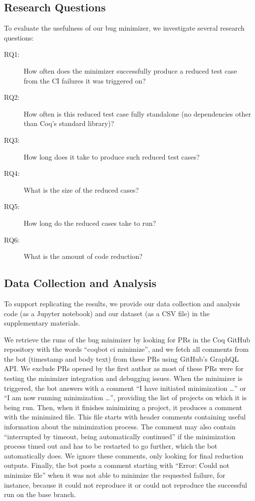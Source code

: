 \documentclass[a4paper,USenglish,cleveref,autoref,thm-restate]{lipics-v2021}
\begin{document}
\subsection{Research Questions}

To evaluate the usefulness of our bug minimizer, we investigate several research questions:

\begin{description}
\item[RQ1:] How often does the minimizer successfully produce a reduced test case from the CI failures it was triggered on?
\item[RQ2:] How often is this reduced test case fully standalone (no dependencies other than Coq's standard library)?
\item[RQ3:] How long does it take to produce such reduced test cases?
\item[RQ4:] What is the size of the reduced cases?
\item[RQ5:] How long do the reduced cases take to run?
\item[RQ6:] What is the amount of code reduction?
\end{description}

\subsection{Data Collection and Analysis}

To support replicating the results, we provide our data collection and analysis code (as a Jupyter notebook) and our dataset (as a CSV file) in the supplementary materials.

We retrieve the runs of the bug minimizer by looking for PRs in the Coq GitHub repository with the words ``coqbot ci minimize'', and we fetch all comments from the bot (timestamp and body text) from these PRs using GitHub's GraphQL API.
We exclude PRs opened by the first author as most of these PRs were for testing the minimizer integration and debugging issues.
When the minimizer is triggered, the bot answers with a comment ``I have initiated minimization \ldots'' or ``I am now running minimization \ldots'', providing the list of projects on which it is being run.
%
Then, when it finishes minimizing a project, it produces a comment with the minimized file.
%
This file starts with header comments containing useful information about the minimization process. %
%
The comment may also contain ``interrupted by timeout, being automatically continued'' if the minimization process timed out and has to be restarted to go further, which the bot automatically does.
%
We ignore these comments, only looking for final reduction outputs.
%
Finally, the bot posts a comment starting with ``Error: Could not minimize file'' when it was not able to minimize the requested failure, for instance, because it could not reproduce it or could not reproduce the successful run on the base branch.
\end{document}
